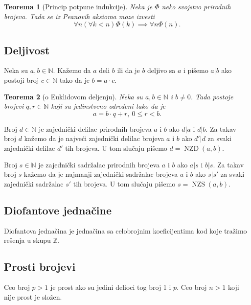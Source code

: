 \documentclass[12p,14paper]{article}
\DeclareMathOperator{\nzd}{NZD}
\DeclareMathOperator{\nzs}{NZS}
\newtheorem*{theorem}{Teorema}
\begin{document}
\begin{multicols}{2}
    \begin{theorem}[Princip potpune indukcije]
        Neka je $\Phi$ neko svojstvo prirodnih brojeva. Tada se iz Peanovih 
        aksioma moze izvesti
        \[\forall n (\forall k < n) \Phi (k) \implies \forall n \Phi (n).\]
    \end{theorem}
    
\subsection{Deljivost}

    Neka su $a, b \in \mathbb{N}$. Kažemo da $a$ deli $b$ ili da je $b$ 
    deljivo sa $a$ i pišemo $a | b$ ako postoji broj $c \in \mathbb{N}$ tako 
    da je $b = a \cdot c$.

    \begin{theorem}[o Euklidovom deljenju]
        Neka su $a, b \in \mathbb{N}$ i $b \neq 0$. Tada postoje brojevi 
        $q, r \in \mathbb{N}$ koji su jedinstveno određeni tako da je 
        \[a = b \cdot q + r,\ 0 \leq r < b.\]
    \end{theorem}

    Broj $d \in \mathbb{N}$ je zajednički delilac prirodnih brojeva $a$ i $b$ 
    ako $d | a$ i $d | b$. Za takav broj $d$ kažemo da je najveći zajednički 
    delilac brojeva $a$ i $b$ ako $d' | d$ za svaki zajednički delilac $d'$ 
    tih brojeva. U tom slučaju pišemo $d = \nzd (a, b)$.

    Broj $s \in \mathbb{N}$ je zajednički sadržalac prirodnih brojeva $a$ i
    $b$ ako $a | s$ i $b | s$. Za takav broj $s$ kažemo da je najmanji 
    zajednički sadržalac brojeva $a$ i $b$ ako $s | s'$ za svaki zajednički 
    sadržalac $s'$ tih brojeva. U tom slučaju pišemo $s = \nzs (a, b)$.

\subsection{Diofantove jednačine}

    Diofantova jednačina je jednačina sa celobrojnim koeficijentima kod koje 
    tražimo rešenja u skupu $\mathbb{Z}$.

\subsection{Prosti brojevi}

    Ceo broj $p > 1$ je prost ako su jedini delioci tog broj 1 i $p$.
    Ceo broj $n > 1$ koji nije prost je složen.


\end{multicols}
\end{document}
